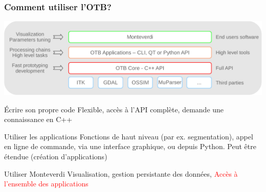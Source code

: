 \documentclass[8pt]{beamer}
\begin{document}
\begin{frame}
\frametitle{Comment utiliser l'OTB?}
\vspace{-0.5cm}
\begin{center}
\includegraphics[width=\textwidth]{images/sandwich.pdf}
\end{center}
\vspace{-0.5cm}
\begin{block}{Écrire son propre code}
 Flexible, accès à l'API complète, demande une connaissance en C++
\end{block}
\begin{block}{Utiliser les applications}
 Fonctions de haut niveau (par ex. segmentation), appel en ligne de commande, via une interface graphique, ou depuis Python. Peut être étendue (création d'applications)
\end{block}
\begin{block}{Utiliser Monteverdi}
Visualisation, gestion persistante des données, \textcolor{red}{Accès à l'ensemble des applications}
\end{block}
\end{frame}
\end{document}
